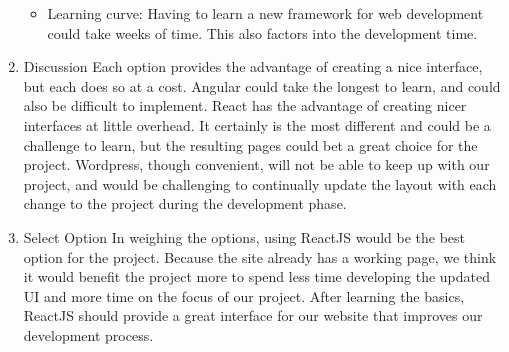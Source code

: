 \documentclass[letterpaper, 10pt, draftclsnofoot, compsoc, onecolumn]{IEEEtran}
\begin{document}
\begin{enumerate}
\begin{itemize}
					\item{Learning curve: Having to learn a new framework for web development could take weeks of time. This also factors into the development time.}
				\end{itemize}
			\item{Discussion}
			Each option provides the advantage of creating a nice interface, but each does so at a cost. Angular could take the longest to learn, and could also be difficult to implement. React has the advantage of creating nicer interfaces at little overhead. It certainly is the most different and could be a challenge to learn, but the resulting pages could bet a great choice for the project. Wordpress, though convenient, will not be able to keep up with our project, and would be challenging to continually update the layout with each change to the project during the development phase.
			
			\item{Select Option}
			In weighing the options, using ReactJS would be the best option for the project. Because the site already has a working page, we think it would benefit the project more to spend less time developing the updated UI and more time on the focus of our project. After learning the basics, ReactJS should provide a great interface for our website that improves our development process.
		\end{enumerate}
\end{document}
